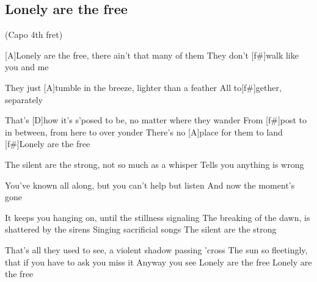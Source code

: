 \subsection*{Lonely are the free   }
\begin{guitar}
(Capo 4th fret)

[A]Lonely are the free, there ain't that many of them
They don't [f#]walk like you and me

They just [A]tumble in the breeze, lighter than a feather
All to[f#]gether, separately

That's [D]how it's s'posed to be, no matter where they wander
From [f#]post to in between, from here to over yonder
There's no [A]place for them to land
[f#]Lonely are the free

The silent are the strong, not so much as a whisper
Tells you anything is wrong

You've known all along, but you can't help but listen
And now the moment's gone

It keeps you hanging on, until the stillness signaling
The breaking of the dawn, is shattered by the sirens
Singing sacrificial songs
The silent are the strong

That's all they used to see, a violent shadow passing 'cross
The sun so fleetingly, that if you have to ask you miss it
Anyway you see
Lonely are the free
Lonely are the free 



\end{guitar}
